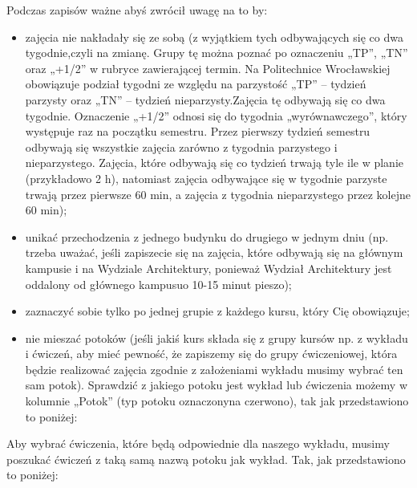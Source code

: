 \documentclass[11pt]{article}
\begin{document}
\indent \hspace{0.5cm} Podczas zapisów ważne abyś zwrócił uwagę na to by:
\begin{itemize}
    \item zajęcia nie nakładały się ze sobą (z wyjątkiem tych odbywających się co dwa tygodnie,\linebreak czyli na zmianę. Grupy tę można poznać po oznaczeniu „TP”, „TN” oraz „+1/2” w rubryce zawierającej termin. Na Politechnice Wrocławskiej obowiązuje podział tygodni ze względu na parzystość „TP” – tydzień parzysty oraz „TN” – tydzień nieparzysty.\linebreak Zajęcia tę odbywają się co dwa tygodnie. Oznaczenie „+1/2” odnosi się do tygodnia „wyrównawczego”, który występuje raz na początku semestru. Przez pierwszy tydzień semestru odbywają się wszystkie zajęcia zarówno z tygodnia parzystego i nieparzystego. Zajęcia, które odbywają się co tydzień trwają tyle ile w planie (przykładowo 2 h), natomiast zajęcia odbywające się w tygodnie parzyste trwają przez pierwsze 60 min, a zajęcia z tygodnia nieparzystego przez kolejne 60 min);
    \item unikać przechodzenia z jednego budynku do drugiego w jednym dniu (np. trzeba uważać, jeśli zapiszecie się na zajęcia, które odbywają się na głównym kampusie i na Wydziale Architektury, ponieważ Wydział Architektury jest oddalony od głównego kampusu\linebreak o 10-15 minut pieszo);
    \item zaznaczyć sobie tylko po jednej grupie z każdego kursu, który Cię obowiązuje;
    \item nie mieszać potoków (jeśli jakiś kurs składa się z grupy kursów np. z wykładu i ćwiczeń, aby mieć pewność, że zapiszemy się do grupy ćwiczeniowej, która będzie realizować zajęcia zgodnie z założeniami wykładu musimy wybrać ten sam potok). Sprawdzić z jakiego potoku jest wykład lub ćwiczenia możemy w kolumnie „Potok” (typ potoku oznaczony\linebreak na czerwono), tak jak przedstawiono to poniżej:
\end{itemize}


\vspace{0.1cm}

\indent \hspace{0.5cm} Aby wybrać ćwiczenia, które będą odpowiednie dla naszego wykładu, musimy poszukać ćwiczeń z taką samą nazwą potoku jak wykład. Tak, jak przedstawiono to poniżej:\\
\end{document}
